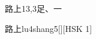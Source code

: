 \begin{entry}{路上}{13,3}{⾜、⼀}
  \begin{phonetics}{路上}{lu4shang5}[][HSK 1]
  \end{phonetics}
\end{entry}
